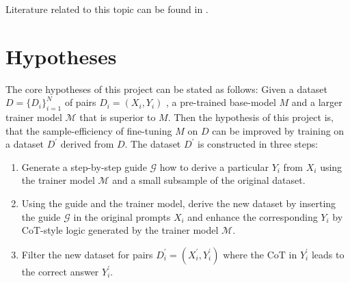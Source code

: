 \documentclass[11pt]{article}
\begin{document}
    Literature related to this topic can be found in
    \cite{chen_learning_2023, chen_fireact_2023, hu_lora_2021, dettmers_qlora_2023}.


    \section{Hypotheses}\label{S:hypothesis}

    The core hypotheses of this project can be stated as follows:
    Given a dataset $D = \{D_i\}_{i=1}^N$ of pairs $D_i = (X_i, Y_i)$ , a pre-trained base-model $M$ and
    a larger trainer model $\mathcal{M}$ that is superior to $M$.
    Then the hypothesis of this project is, that the sample-efficiency of fine-tuning $M$ on $D$ can be improved by
    training on a dataset $D^\prime$ derived from $D$.
    The dataset $D^\prime$ is constructed in three steps:
    \begin{enumerate}
        \item Generate a step-by-step guide $\mathcal{G}$ how to derive a particular $Y_i$ from $X_i$ using the trainer model
        $\mathcal{M}$ and a small subsample of the original dataset.
        \item Using the guide and the trainer model, derive the new dataset by inserting the guide $\mathcal{G}$ in the
        original prompts $X_i$ and enhance the corresponding $Y_i$ by CoT-style logic generated by the trainer model $\mathcal{M}$.
        \item Filter the new dataset for pairs $D^\prime_i = (X^\prime_i, Y^\prime_i)$ where the CoT in $Y^\prime_i$
        leads to the correct answer $Y^\prime_i$.
    \end{enumerate}

\end{document}
